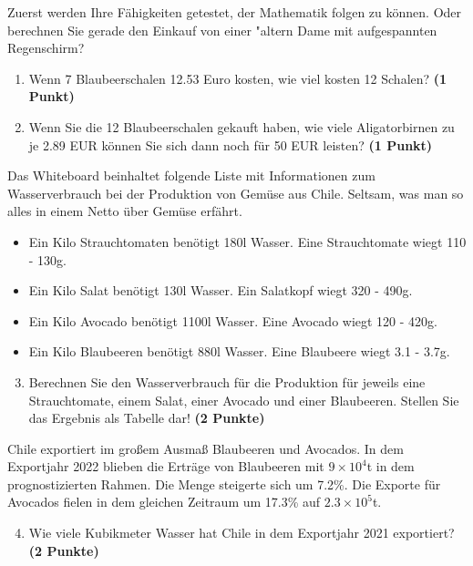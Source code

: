 \documentclass[a4paper, 9pt]{scrartcl}\usepackage[]{graphicx}\usepackage[]{xcolor}
\begin{document}
Zuerst werden Ihre Fähigkeiten getestet, der Mathematik folgen zu können. Oder berechnen Sie gerade den Einkauf von einer {"a}ltern Dame mit aufgespannten Regenschirm?\\

\begin{enumerate}
\item Wenn 7 Blaubeerschalen 12.53 Euro kosten,  wie viel kosten 12 Schalen? \textbf{(1 Punkt)}
\item Wenn Sie die 12 Blaubeerschalen gekauft haben, wie viele Aligatorbirnen zu je 2.89 EUR können Sie sich dann noch für 50 EUR leisten? \textbf{(1 Punkt)}
\end{enumerate}

Das Whiteboard beinhaltet folgende Liste mit Informationen zum Wasserverbrauch bei der Produktion von Gemüse aus Chile. Seltsam, was man so alles in einem Netto über Gemüse erfährt.
  
\begin{itemize}[noitemsep]
\item Ein Kilo Strauchtomaten benötigt 180l Wasser. Eine Strauchtomate wiegt 110 - 130g.
\item Ein Kilo Salat benötigt 130l Wasser. Ein Salatkopf wiegt 320 - 490g.
\item Ein Kilo Avocado benötigt 1100l Wasser. Eine Avocado wiegt 120 - 420g.
\item Ein Kilo Blaubeeren benötigt 880l Wasser. Eine Blaubeere wiegt 3.1 - 3.7g.
\end{itemize}

\begin{enumerate}
  \setcounter{enumi}{2}
\item Berechnen Sie den Wasserverbrauch für die Produktion für jeweils eine Strauchtomate, einem Salat, einer Avocado und einer Blaubeeren. Stellen Sie das Ergebnis als Tabelle dar! \textbf{(2 Punkte)}
\end{enumerate}

Chile exportiert im großem Ausmaß Blaubeeren und Avocados. In dem Exportjahr 2022 blieben die Erträge von Blaubeeren mit \ensuremath{9\times 10^{4}}t in dem prognostizierten Rahmen. Die Menge steigerte sich um 7.2\%. Die Exporte für Avocados fielen in dem gleichen Zeitraum um 17.3\% auf \ensuremath{2.3\times 10^{5}}t.

\begin{enumerate}
  \setcounter{enumi}{3}
\item Wie viele Kubikmeter Wasser hat Chile in dem Exportjahr 2021 exportiert? \textbf{(2 Punkte)}
\end{enumerate}
\end{document}
